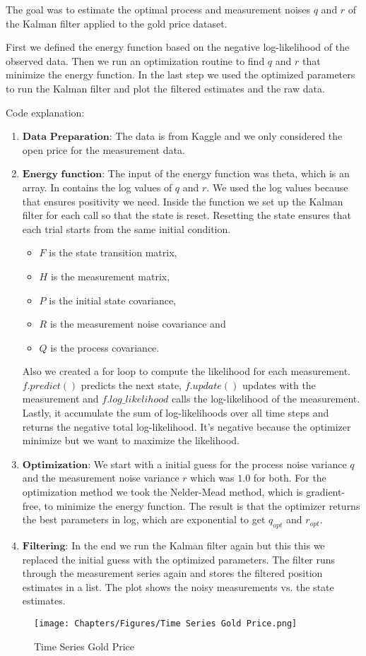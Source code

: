 The goal was to estimate the optimal process and measurement noises $q$ and $r$ of the Kalman filter applied to the gold price dataset. 

First we defined the energy function based on the negative log-likelihood of the observed data. Then we run an optimization routine to find $q$ and $r$ that minimize the energy function. In the last step we used the optimized parameters to run the Kalman filter and plot the filtered estimates and the raw data. 

Code explanation: 
\begin{enumerate}
    \item $\textbf{Data Preparation}$: The data is from Kaggle and we only considered the open price for the measurement data. 
    \item $\textbf{Energy function}$: The input of the energy function was theta, which is an array. In contains the log values of $q$ and $r$. We used the log values because that ensures positivity we need. Inside the function we set up the Kalman filter for each call so that the state is reset. Resetting the state ensures that each trial starts from the same initial condition. 
    \begin{itemize}
        \item $F$ is the state transition matrix,
        \item $H$ is the measurement matrix,
        \item $P$ is the initial state covariance,
        \item $R$ is the measurement noise covariance and
        \item $Q$ is the process covariance.
    \end{itemize}
    Also we created a for loop to compute the likelihood for each measurement. $f.predict()$ predicts the next state, $f.update()$ updates with the measurement and $f.log\_likelihood$ calls the log-likelihood of the measurement. Lastly, it accumulate the sum of log-likelihoods over all time steps and returns the negative total log-likelihood. It's negative because the optimizer minimize but we want to maximize the likelihood.
    \item $\textbf{Optimization}$: We start with a initial guess for the process noise variance $q$ and the measurement noise variance $r$ which was $1.0$ for both. For the optimization method we took the Nelder-Mead method, which is gradient-free, to minimize the energy function. The result is that the optimizer returns the best parameters in log, which are exponential to get $q_{opt}$ and $r_{opt}$.
    \item $\textbf{Filtering}$: In the end we run the Kalman filter again but this this we replaced the initial guess with the optimized parameters. The filter runs through the measurement series again and stores the filtered position estimates in a list. The plot shows the noisy measurements vs. the state estimates. 
\end{enumerate}


\begin{figure}
    \centering
    \texttt{[image: Chapters/Figures/Time Series Gold Price.png]}
    \caption{Time Series Gold Price}
    \label{fig:time_series_goldprice}
\end{figure}